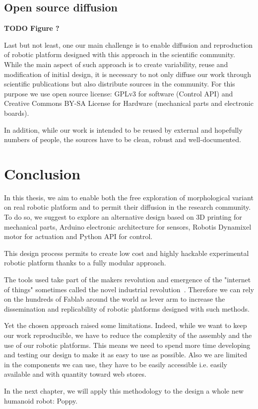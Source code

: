\subsection{Open source diffusion} %

\textbf{TODO Figure ?}

Last but not least, one our main challenge is to enable diffusion and reproduction of robotic platform designed with this approach in the scientific community. While the main aspect of such approach is to create variability, reuse and modification of initial design, it is necessary to not only diffuse our work through scientific publications but also distribute sources in the community. For this purpose we use open source license: GPLv3 for software (Control API) and Creative Commons BY-SA License for Hardware (mechanical parts and electronic boards).

In addition, while our work is intended to be reused by external and hopefully numbers of people, the sources have to be clean, robust and well-documented.



\section{Conclusion} %

In this thesis, we aim to enable both the free exploration of morphological variant on real robotic platform and to permit their diffusion in the research community. To do so, we suggest to explore an alternative design based on 3D printing for mechanical parts, Arduino electronic architecture for sensors, Robotis Dynamixel motor for actuation and Python API for control.

This design process permits to create low cost and highly hackable experimental robotic platform thanks to a fully modular approach.

The tools used take part of the makers revolution and emergence of the "internet of things" sometimes called the novel industrial revolution~\cite{anderson}. Therefore we can rely on the hundreds of Fablab around the world as lever arm to increase the dissemination and replicability of robotic platforms designed with such methods.

Yet the chosen approach raised some limitations. Indeed, while we want to keep our work reproducible, we have to reduce the complexity of the assembly and the use of our robotic platforms. This means we need to spend more time developing and testing our design to make it as easy to use as possible. Also we are limited in the components we can use, they have to be easily accessible i.e. easily available and with quantity toward web stores.


In the next chapter, we will apply this methodology to the design a whole new humanoid robot: Poppy.


